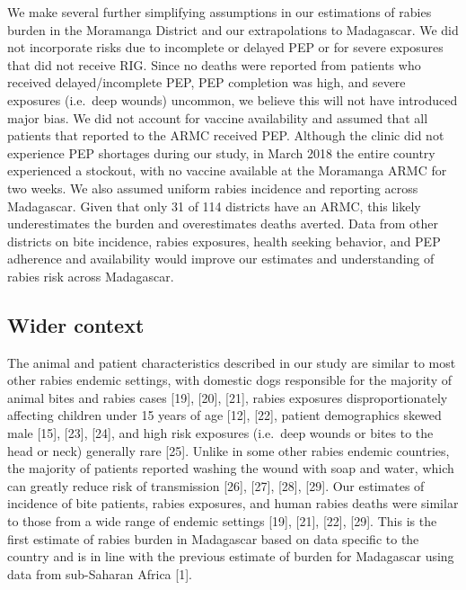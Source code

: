 \documentclass[
]{book}
\begin{document}
We make several further simplifying assumptions in our estimations of rabies burden in the Moramanga District and our extrapolations to Madagascar. We did not incorporate risks due to incomplete or delayed PEP or for severe exposures that did not receive RIG. Since no deaths were reported from patients who received delayed/incomplete PEP, PEP completion was high, and severe exposures (i.e.~deep wounds) uncommon, we believe this will not have introduced major bias. We did not account for vaccine availability and assumed that all patients that reported to the ARMC received PEP. Although the clinic did not experience PEP shortages during our study, in March 2018 the entire country experienced a stockout, with no vaccine available at the Moramanga ARMC for two weeks. We also assumed uniform rabies incidence and reporting across Madagascar. Given that only 31 of 114 districts have an ARMC, this likely underestimates the burden and overestimates deaths averted. Data from other districts on bite incidence, rabies exposures, health seeking behavior, and PEP adherence and availability would improve our estimates and understanding of rabies risk across Madagascar.

\hypertarget{wider-context}{%
\subsection{Wider context}\label{wider-context}}

The animal and patient characteristics described in our study are similar to most other rabies endemic settings, with domestic dogs responsible for the majority of animal bites and rabies cases {[}19{]}, {[}20{]}, {[}21{]}, rabies exposures disproportionately affecting children under 15 years of age {[}12{]}, {[}22{]}, patient demographics skewed male {[}15{]}, {[}23{]}, {[}24{]}, and high risk exposures (i.e.~deep wounds or bites to the head or neck) generally rare {[}25{]}. Unlike in some other rabies endemic countries, the majority of patients reported washing the wound with soap and water, which can greatly reduce risk of transmission {[}26{]}, {[}27{]}, {[}28{]}, {[}29{]}. Our estimates of incidence of bite patients, rabies exposures, and human rabies deaths were similar to those from a wide range of endemic settings {[}19{]}, {[}21{]}, {[}22{]}, {[}29{]}. This is the first estimate of rabies burden in Madagascar based on data specific to the country and is in line with the previous estimate of burden for Madagascar using data from sub-Saharan Africa {[}1{]}.
\end{document}

